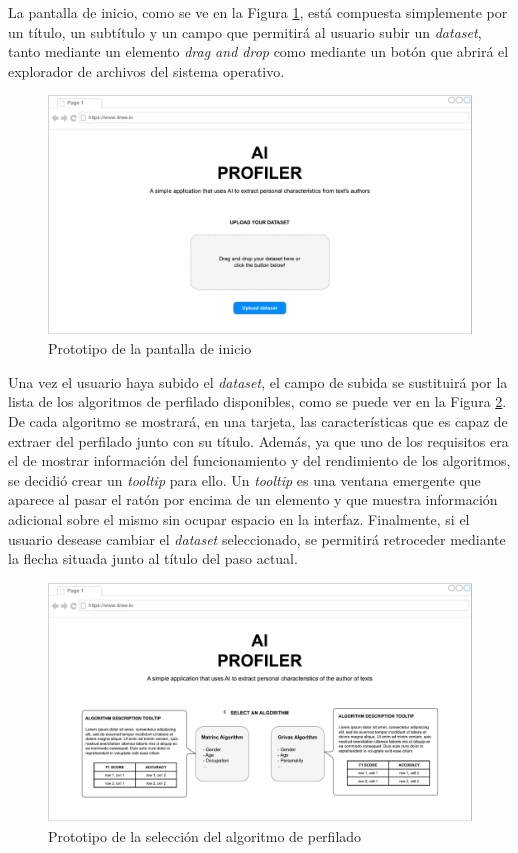 \bigskip
La pantalla de inicio, como se ve en la Figura \ref{fig:prototipo_inicio}, está compuesta simplemente por un título, 
un subtítulo y un campo que permitirá al usuario subir un \textit{dataset}, tanto mediante un elemento \textit{drag and drop} como
mediante un botón que abrirá el explorador de archivos del sistema operativo.

\bigskip
\begin{figure}[H]
	\centering
	\includegraphics[width=\textwidth]{diagramas/landing.pdf}
	\caption{Prototipo de la pantalla de inicio}
	\label{fig:prototipo_inicio}
\end{figure}

\bigskip
Una vez el usuario haya subido el \textit{dataset}, el campo de subida se sustituirá por la lista de los
algoritmos de perfilado disponibles, como se puede ver en la Figura \ref{fig:prototipo_algoritmo_perfilado}. De cada algoritmo se mostrará, en una tarjeta, las características que es capaz de extraer
del perfilado junto con su título. Además, ya que uno de los requisitos era el de mostrar información del funcionamiento
y del rendimiento de los algoritmos, se decidió crear un \textit{tooltip} para ello. Un \textit{tooltip} es una ventana emergente
que aparece al pasar el ratón por encima de un elemento y que muestra información adicional sobre el mismo sin ocupar espacio
en la interfaz. Finalmente, si el usuario desease cambiar el \textit{dataset} seleccionado, se permitirá retroceder mediante
la flecha situada junto al título del paso actual.

\bigskip
\begin{figure}[H]
	\centering
	\includegraphics[width=\textwidth]{diagramas/landing-algorithm.pdf}
	\caption{Prototipo de la selección del algoritmo de perfilado}
	\label{fig:prototipo_algoritmo_perfilado}
\end{figure}


